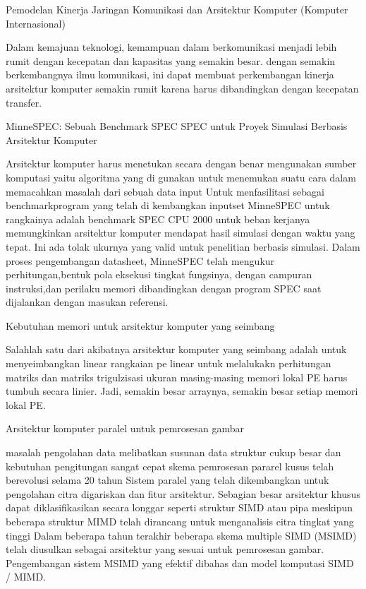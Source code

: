 Pemodelan Kinerja Jaringan Komunikasi dan Arsitektur Komputer (Komputer Internasional)

	Dalam kemajuan teknologi, kemampuan dalam berkomunikasi menjadi lebih rumit dengan kecepatan dan kapasitas yang semakin besar. 
dengan semakin berkembangnya ilmu komunikasi, ini dapat membuat perkembangan kinerja arsitektur komputer semakin rumit karena harus dibandingkan 
dengan kecepatan transfer.\cite{harrison1992performance}

MinneSPEC: Sebuah Benchmark SPEC SPEC untuk Proyek Simulasi Berbasis Arsitektur Komputer

	Arsitektur komputer harus menetukan secara dengan benar mengunakan sumber komputasi yaitu algoritma yang di gunakan untuk menemukan suatu cara dalam memacahkan masalah dari sebuah data input
Untuk menfasilitasi sebagai benchmarkprogram yang telah di kembangkan inputset MinneSPEC untuk rangkainya adalah benchmark SPEC CPU 2000 untuk beban kerjanya  memungkinkan arsitektur komputer mendapat hasil simulasi dengan waktu yang tepat.
Ini ada tolak ukurnya  yang valid untuk penelitian berbasis simulasi. 
Dalam proses pengembangan datasheet, MinneSPEC telah mengukur perhitungan,bentuk pola eksekusi tingkat fungsinya, dengan campuran instruksi,dan perilaku memori dibandingkan dengan program SPEC saat dijalankan dengan masukan referensi.\cite{kleinosowski2002minnespec}

Kebutuhan memori untuk arsitektur komputer yang seimbang

	Salahlah satu dari akibatnya arsitektur komputer yang seimbang  adalah untuk menyeimbangkan linear rangkaian pe linear untuk melalukakn perhitungan matriks dan matriks trigulzisasi ukuran masing-masing memori lokal PE harus tumbuh secara linier.
Jadi, semakin besar arraynya, semakin besar setiap memori lokal PE.\cite{kung1986memory}

Arsitektur komputer paralel untuk pemrosesan gambar

	masalah pengolahan data melibatkan susunan data struktur cukup besar dan kebutuhan pengitungan sangat cepat skema pemrosesan pararel  kusus telah berevolusi selama 20 tahun 
Sistem paralel yang telah dikembangkan untuk pengolahan citra digariskan dan fitur arsitektur.
Sebagian besar arsitektur khusus dapat diklasifikasikan secara longgar seperti struktur SIMD atau pipa meskipun beberapa struktur MIMD telah dirancang untuk menganalisis citra tingkat yang  tinggi
Dalam beberapa tahun terakhir beberapa skema multiple SIMD (MSIMD) telah diusulkan sebagai arsitektur yang sesuai untuk pemrosesan gambar.
Pengembangan sistem MSIMD yang efektif dibahas dan model komputasi SIMD / MIMD.\cite{reeves1984parallel}

